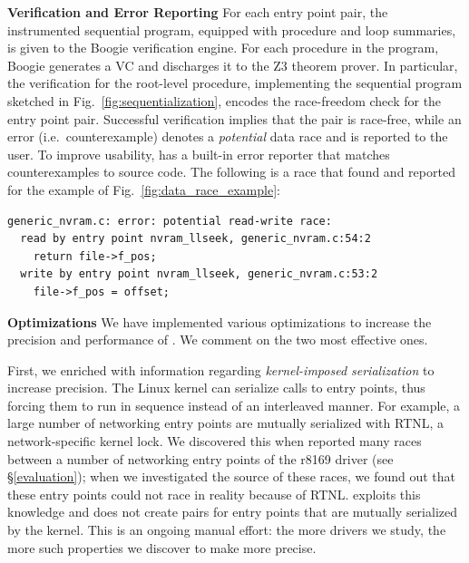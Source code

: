 \noindent\textbf{Verification and Error Reporting }
%
For each entry point pair, the instrumented sequential program, equipped with procedure and loop summaries, is given to the Boogie verification engine. For each procedure in the program, Boogie generates a VC and discharges it to the Z3 theorem prover.  In particular, the verification for the root-level procedure, implementing the sequential program sketched in Fig.~\ref{fig:sequentialization}, encodes the race-freedom check for the entry point pair. Successful verification implies that the pair is race-free, while an error (i.e.\ counterexample) denotes a \emph{potential} data race and is reported to the user. To improve usability, \whoop has a built-in error reporter that matches counterexamples to source code. The following is a race that \whoop found and reported for the example of Fig.~\ref{fig:data_race_example}: 

\begin{lstlisting}[keywordstyle=\ttfamily]
generic_nvram.c: error: potential read-write race:
  read by entry point nvram_llseek, generic_nvram.c:54:2
    return file->f_pos;
  write by entry point nvram_llseek, generic_nvram.c:53:2
    file->f_pos = offset;
\end{lstlisting}

\noindent\textbf{Optimizations }
%
We have implemented various optimizations to increase the precision and performance of \whoop.  We comment on the two most effective ones.

First, we enriched \whoop with information regarding \emph{kernel-imposed serialization} to increase precision. The Linux kernel can serialize calls to entry points, thus forcing them to run in sequence instead of an interleaved manner. For example, a large number of networking entry points are mutually serialized with RTNL, a network-specific kernel lock. We discovered this when \whoop reported many races between a number of networking entry points of the r8169 driver (see \S\ref{evaluation}); when we investigated the source of these races, we found out that these entry points could not race in reality because of RTNL. \whoop exploits this knowledge and does not create pairs for entry points that are mutually serialized by the kernel. This is an ongoing manual effort: the more drivers we study, the more such properties we discover to make \whoop more precise.

